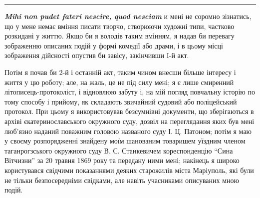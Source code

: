 \documentclass[a4paper,20pt]{report}
\begin{document}

\par\noindent\rule{\textwidth}{0.4pt}

\textbf{\em Mihi non pudet fateri nescire, quod nesciam} и мені не соромно зізнатись, що у 
мене немає вміння писати творчо, створюючи художні типи, частково розкидані у життю. Якщо би я володів таким 
вмінням, я надав би перевагу зображенню описаних подій у формі комедії або драми, і в цьому місці зображення дійсності
опустив би завісу, закінчивши I-й акт.

Потім я почав би 2-й і останній акт, таким чином внесши більше інтересу і життя у цю роботу;
але, на жаль, це не під силу мені; я є лише смиренний літописець-протоколіст, і відновлюю забуту і,
на мій погляд повчальну історію по тому способу і прийому, як складають
звичайний судовий або поліцейський протокол. При цьому я використовував безсумнівні документи, що зберігаються
в архіві єкатеринославського окружного суду, дозвіл на переглядання яких був мені люб'язно наданий поважним
головою названого суду І. Ц. Патоном; потім я маю у своєму розпорядженні знайдену моїм шанованим 
товаришем уїздним членом таганрогзського окружного суду В. С. Станкевичем кореспонденцію ``Сина Вітчизни''
за 20 травня 1869 року та передану ними мені; накінець я широко користувався свідчими показаннями деяких старожилів міста Маріуполь,
які були не тільки безпосередніми свідками, але навіть учасниками описуваних мною подій.
\end{document}
